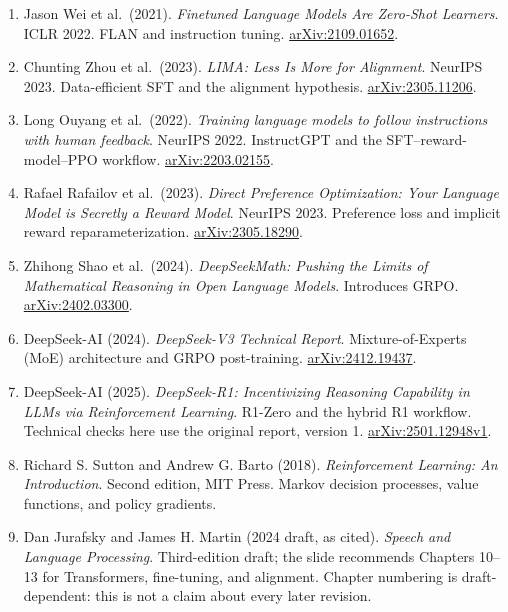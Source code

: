 \documentclass[11pt,a4paper]{article}
\numberwithin{equation}{section}
\numberwithin{figure}{section}
\numberwithin{table}{section}
\begin{document}
\begin{enumerate}
\item Jason Wei et al.\ (2021). \emph{Finetuned Language Models Are Zero-Shot Learners}. ICLR 2022. FLAN and instruction tuning. \href{https://arxiv.org/abs/2109.01652}{arXiv:2109.01652}.
\item Chunting Zhou et al.\ (2023). \emph{LIMA: Less Is More for Alignment}. NeurIPS 2023. Data-efficient SFT and the alignment hypothesis. \href{https://arxiv.org/abs/2305.11206}{arXiv:2305.11206}.
\item Long Ouyang et al.\ (2022). \emph{Training language models to follow instructions with human feedback}. NeurIPS 2022. InstructGPT and the SFT--reward-model--PPO workflow. \href{https://arxiv.org/abs/2203.02155}{arXiv:2203.02155}.
\item Rafael Rafailov et al.\ (2023). \emph{Direct Preference Optimization: Your Language Model is Secretly a Reward Model}. NeurIPS 2023. Preference loss and implicit reward reparameterization. \href{https://arxiv.org/abs/2305.18290}{arXiv:2305.18290}.
\item Zhihong Shao et al.\ (2024). \emph{DeepSeekMath: Pushing the Limits of Mathematical Reasoning in Open Language Models}. Introduces GRPO. \href{https://arxiv.org/abs/2402.03300}{arXiv:2402.03300}.
\item DeepSeek-AI (2024). \emph{DeepSeek-V3 Technical Report}. Mixture-of-Experts (MoE) architecture and GRPO post-training. \href{https://arxiv.org/abs/2412.19437}{arXiv:2412.19437}.
\item DeepSeek-AI (2025). \emph{DeepSeek-R1: Incentivizing Reasoning Capability in LLMs via Reinforcement Learning}. R1-Zero and the hybrid R1 workflow. Technical checks here use the original report, version 1. \href{https://arxiv.org/abs/2501.12948v1}{arXiv:2501.12948v1}.
\item Richard S. Sutton and Andrew G. Barto (2018). \emph{Reinforcement Learning: An Introduction}. Second edition, MIT Press. Markov decision processes, value functions, and policy gradients.
\item Dan Jurafsky and James H. Martin (2024 draft, as cited). \emph{Speech and Language Processing}. Third-edition draft; the slide recommends Chapters 10--13 for Transformers, fine-tuning, and alignment. Chapter numbering is draft-dependent: this is not a claim about every later revision.
\end{enumerate}
\end{document}

